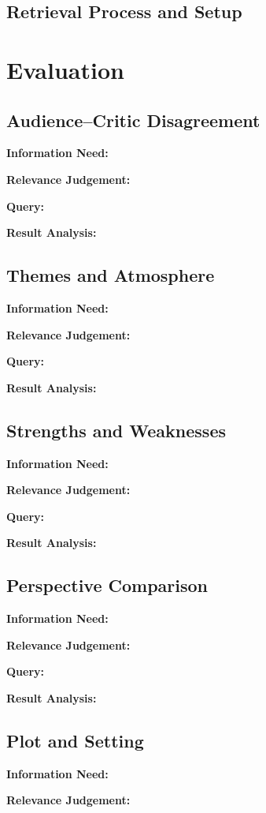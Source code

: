 \subsection{Retrieval Process and Setup}

\section{Evaluation}

\subsection{Audience--Critic Disagreement}
\textbf{Information Need:}

\textbf{Relevance Judgement:}

\textbf{Query:}

\textbf{Result Analysis:}

\subsection{Themes and Atmosphere}
\textbf{Information Need:}

\textbf{Relevance Judgement:}

\textbf{Query:}

\textbf{Result Analysis:}

\subsection{Strengths and Weaknesses}
\textbf{Information Need:}

\textbf{Relevance Judgement:}

\textbf{Query:}

\textbf{Result Analysis:}

\subsection{Perspective Comparison}
\textbf{Information Need:}

\textbf{Relevance Judgement:}

\textbf{Query:}

\textbf{Result Analysis:}

\subsection{Plot and Setting}
\textbf{Information Need:}

\textbf{Relevance Judgement:}

